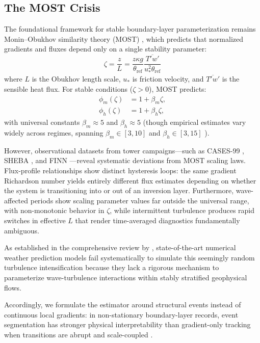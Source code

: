 \documentclass[11pt,a4paper]{article}
\begin{document}
\subsection{The MOST Crisis}

The foundational framework for stable boundary-layer parameterization remains Monin--Obukhov similarity theory (MOST) \citep{Obukhov1946, Paulson1970}, which predicts that normalized gradients and fluxes depend only on a single stability parameter:
\begin{equation}
\zeta = \frac{z}{L} = \frac{z \kappa g}{\theta_{\mathrm{ref}}} \frac{\overline{T'w'}}{u_*^2 \theta_{\mathrm{ref}}}
\label{eq:zeta}
\end{equation}
where $L$ is the Obukhov length scale, $u_*$ is friction velocity, and $\overline{T'w'}$ is the sensible heat flux. For stable conditions ($\zeta > 0$), MOST predicts:
\begin{equation}
\begin{aligned}
\phi_m(\zeta) &= 1 + \beta_m\zeta, \\
\phi_h(\zeta) &= 1 + \beta_h\zeta,
\end{aligned}
\end{equation}
with universal constants $\beta_m \approx 5$ and $\beta_h \approx 5$ (though empirical estimates vary widely across regimes, spanning $\beta_m \in [3, 10]$ and $\beta_h \in [3, 15]$ \citep{Dyer1974, Högström1988}).

However, observational datasets from tower campaigns---such as CASES-99 \citep{Poulos2002}, SHEBA \citep{Uttal2002}, and FINN \citep{Mahrt2013}---reveal systematic deviations from MOST scaling laws. Flux-profile relationships show distinct hysteresis loops: the same gradient Richardson number yields entirely different flux estimates depending on whether the system is transitioning into or out of an inversion layer. Furthermore, wave-affected periods show scaling parameter values far outside the universal range, with non-monotonic behavior in $\zeta$, while intermittent turbulence produces rapid switches in effective $L$ that render time-averaged diagnostics fundamentally ambiguous.

As established in the comprehensive review by \citet{Sun2015}, state-of-the-art numerical weather prediction models fail systematically to simulate this seemingly random turbulence intensification because they lack a rigorous mechanism to parameterize wave-turbulence interactions within stably stratified geophysical flows.

Accordingly, we formulate the estimator around structural events instead of continuous local gradients: in non-stationary boundary-layer records, event segmentation has stronger physical interpretability than gradient-only tracking when transitions are abrupt and scale-coupled \citep{Kang2014a, Narasimha1995}.
\end{document}
